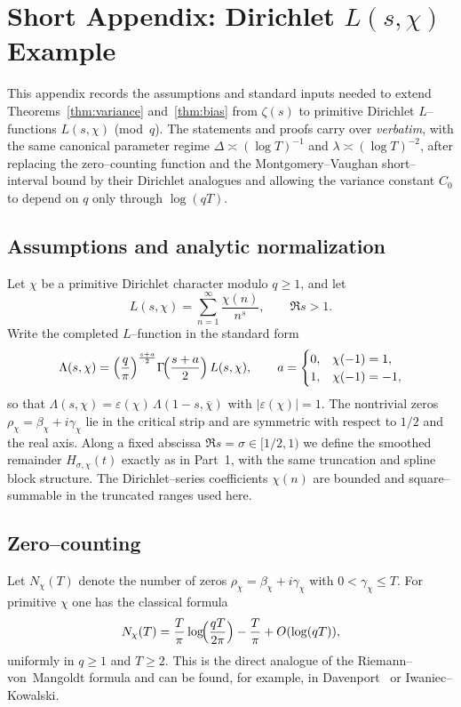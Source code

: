 \section{Short Appendix: Dirichlet \texorpdfstring{$L(s,\chi)$}{L(s,χ)} Example}
\label{app:dirichlet}

This appendix records the assumptions and standard inputs needed to extend
Theorems~\ref{thm:variance} and~\ref{thm:bias} from $\zeta(s)$ to primitive
Dirichlet $L$–functions $L(s,\chi)$ (mod~$q$). The statements and proofs
carry over \emph{verbatim}, with the same canonical parameter regime
$\Delta\asymp(\log T)^{-1}$ and $\lambda\asymp(\log T)^{-2}$, after replacing
the zero–counting function and the Montgomery–Vaughan short–interval bound by
their Dirichlet analogues and allowing the variance constant $C_0$ to depend
on $q$ only through $\log(qT)$.

\subsection*{Assumptions and analytic normalization}
Let $\chi$ be a primitive Dirichlet character modulo $q\ge 1$, and let
\[
L(s,\chi)=\sum_{n=1}^\infty \frac{\chi(n)}{n^s}, \qquad \Re s>1.
\]
Write the completed $L$–function in the standard form
\[
\Lambda(s,\chi)
=\Bigl(\frac{q}{\pi}\Bigr)^{\frac{s+a}{2}}
\Gamma\!\Bigl(\frac{s+a}{2}\Bigr)\,L(s,\chi),
\qquad
a=\begin{cases}
0,& \chi(-1)=1,\\
1,& \chi(-1)=-1,
\end{cases}
\]
so that $\Lambda(s,\chi)=\varepsilon(\chi)\,\Lambda(1-s,\overline\chi)$ with
$|\varepsilon(\chi)|=1$. The nontrivial zeros $\rho_\chi=\beta_\chi+i\gamma_\chi$
lie in the critical strip and are symmetric with respect to $1/2$ and the real axis.
Along a fixed abscissa $\Re s=\sigma\in[1/2,1)$ we define the smoothed remainder
$H_{\sigma,\chi}(t)$ exactly as in Part~1, with the same truncation and spline
block structure. The Dirichlet–series coefficients $\chi(n)$ are bounded and
square–summable in the truncated ranges used here.

\subsection*{Zero–counting}
Let $N_\chi(T)$ denote the number of zeros $\rho_\chi=\beta_\chi+i\gamma_\chi$
with $0<\gamma_\chi\le T$. For primitive $\chi$ one has the classical formula
\begin{equation}
N_\chi(T)
=\frac{T}{\pi}\log\!\Bigl(\frac{qT}{2\pi}\Bigr)-\frac{T}{\pi}
+O(\log(qT)),
\label{eq:Nchi}
\end{equation}
uniformly in $q\ge 1$ and $T\ge 2$.
This is the direct analogue of the Riemann–von~Mangoldt formula and can be found,
for example, in Davenport~\cite[Ch.~20]{titchmarsh} or Iwaniec–Kowalski.

